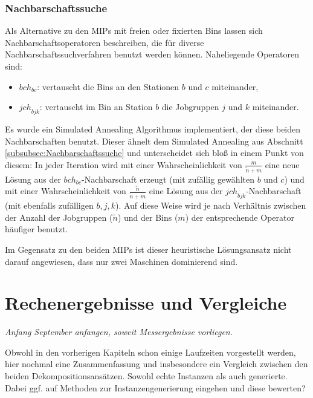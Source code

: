 \documentclass{scrreprt}
\begin{document}
\subsection{Nachbarschaftssuche}
Als Alternative zu den MIPs mit freien oder fixierten Bins lassen sich Nachbarschaftsoperatoren beschreiben, 
die für diverse Nachbarschaftssuchverfahren benutzt werden können.
Naheliegende Operatoren sind:
\begin{itemize}
    \item $\mathit{bch}_{bc}$: vertauscht die Bins an den Stationen $b$ und $c$ miteinander,
    \item $\mathit{jch}_{bjk}$: vertauscht im Bin an Station $b$ die Jobgruppen $j$ und $k$ miteinander.
\end{itemize}
Es wurde ein Simulated Annealing Algorithmus implementiert, der diese beiden Nachbarschaften benutzt.
Dieser ähnelt dem Simulated Annealing aus Abschnitt \ref{subsubsec:Nachbarschaftssuche} und unterscheidet sich bloß in einem Punkt von diesem:
In jeder Iteration wird mit einer Wahrscheinlichkeit von $\frac{m}{\tilde{n}+m}$ eine neue Lösung aus der $\mathit{bch}_{bc}$-Nachbarschaft erzeugt 
(mit zufällig gewählten $b$ und $c$) und mit einer Wahrscheinlichkeit von $\frac{\tilde{n}}{\tilde{n}+m}$ eine Lösung aus der $\mathit{jch}_{bjk}$-Nachbarschaft
(mit ebenfalls zufälligen $b,j,k$).
Auf diese Weise wird je nach Verhältnis zwischen der Anzahl der Jobgruppen ($\tilde{n}$) und der Bins ($m$) der entsprechende Operator häufiger benutzt.

Im Gegensatz zu den beiden MIPs ist dieser heuristische Lösungsansatz nicht darauf angewiesen, dass nur zwei Maschinen dominierend sind.


\chapter{Rechenergebnisse und Vergleiche}
\textit{Anfang September anfangen, soweit Messergebnisse vorliegen.}

Obwohl in den vorherigen Kapiteln schon einige Laufzeiten vorgestellt werden, hier nochmal eine Zusammenfassung und insbesondere ein Vergleich
zwischen den beiden Dekompositionsansätzen. Sowohl echte Instanzen als auch generierte. 
Dabei ggf. auf Methoden zur Instanzengenerierung eingehen und diese bewerten?



\newpage


\end{document}
